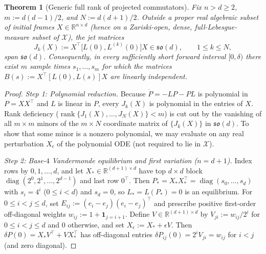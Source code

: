 \documentclass[11pt]{article}
\theoremstyle{plain}
\newtheorem{theorem}{Theorem}
\theoremstyle{definition}
\theoremstyle{remark}
\DeclareMathOperator{\diag}{diag}
\DeclareMathOperator{\rank}{rank}
\begin{document}
\begin{theorem}[Generic full rank of projected commutators]\label{thm:generic}
Fix $n > d \ge 2$, $m := d(d-1)/2$, and $N := d(d+1)/2$.
Outside a proper real algebraic subset of initial frames $X \in \mathbb{R}^{n \times d}$ (hence on a Zariski-open, dense, full-Lebesgue-measure subset of $\mathcal{X}$), the jet matrices
\[
J_k(X) := X^\top\bigl[L(0), L^{(k)}(0)\bigr]X \in \mathfrak{so}(d), \qquad 1 \le k \le N,
\]
span $\mathfrak{so}(d)$.
Consequently, in every sufficiently short forward interval $[0, \delta)$ there exist $m$ sample times $s_1, \dots, s_m$ for which the matrices $B(s) := X^\top[L(0), L(s)]X$ are linearly independent.
\end{theorem}

\begin{proof}
\emph{Step 1: Polynomial reduction.}
Because $\dot{P} = -LP - PL$ is polynomial in $P = XX^\top$ and $L$ is linear in $P$, every $J_k(X)$ is polynomial in the entries of $X$.
Rank deficiency ($\rank\{J_1(X), \dots, J_N(X)\} < m$) is cut out by the vanishing of all $m \times m$ minors of the $m \times N$ coordinate matrix of $\{J_k(X)\}$ in $\mathfrak{so}(d)$.
To show that some minor is a nonzero polynomial, we may evaluate on any real perturbation $X_\epsilon$ of the polynomial ODE (not required to lie in $\mathcal{X}$).

\emph{Step 2: Base-$4$ Vandermonde equilibrium and first variation ($n = d + 1$).}
Index rows by $0, 1, \dots, d$, and let $X_* \in \mathbb{R}^{(d+1) \times d}$ have top $d \times d$ block $\diag(2^0, 2^1, \dots, 2^{d-1})$ and last row $0^\top$.
Then $P_* = X_* X_*^\top = \diag(s_0, \dots, s_d)$ with $s_i = 4^i$ ($0 \le i < d$) and $s_d = 0$, so $L_* = L(P_*) = 0$ is an equilibrium.
For $0 \le i < j \le d$, set $E_{ij} := (e_i - e_j)(e_i - e_j)^\top$ and prescribe positive first-order off-diagonal weights $w_{ij} := 1 + \mathbf{1}_{j = i+1}$.
Define $V \in \mathbb{R}^{(d+1) \times d}$ by $V_{ji} := w_{ij}/2^i$ for $0 \le i < j \le d$ and $0$ otherwise, and set $X_\epsilon := X_* + \epsilon V$.
Then $\delta P(0) = X_* V^\top + V X_*^\top$ has off-diagonal entries $\delta P_{ij}(0) = 2^i V_{ji} = w_{ij}$ for $i < j$ (and zero diagonal).


\end{proof}
\end{document}
